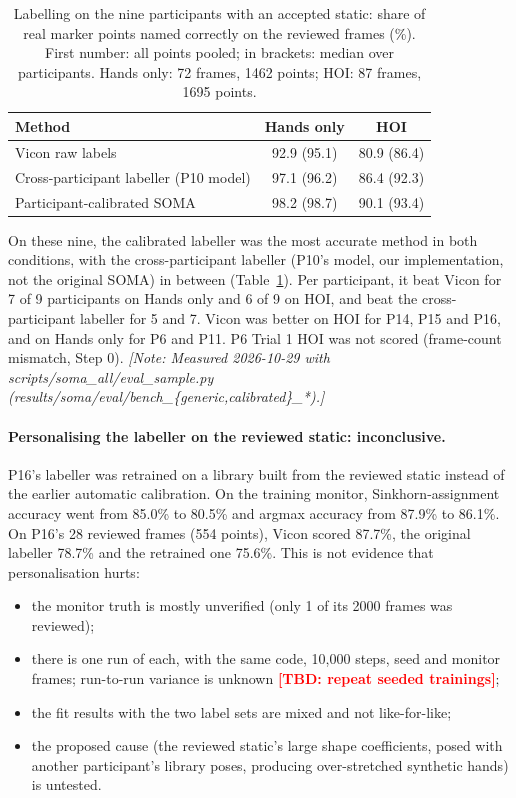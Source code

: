 \documentclass[11pt,a4paper]{article}
\newcommand{\tbd}[1]{\textcolor{red}{\textbf{[TBD: #1]}}}
\newcommand{\note}[1]{\textcolor{orange!80!black}{\textit{[Note: #1]}}}
\begin{document}
\begin{table}[h]\centering\small
\caption{Labelling on the nine participants with an accepted static: share of real marker points named correctly on the
reviewed frames (\%). First number: all points pooled; in brackets: median over participants. Hands only: 72 frames,
1462 points; HOI: 87 frames, 1695 points.}\label{tab:bench-label}
\begin{tabular}{lcc}\toprule
Method & Hands only & HOI \\\midrule
Vicon raw labels & 92.9 (95.1) & 80.9 (86.4) \\
Cross-participant labeller (P10 model) & 97.1 (96.2) & 86.4 (92.3) \\
Participant-calibrated SOMA & 98.2 (98.7) & 90.1 (93.4) \\\bottomrule
\end{tabular}
\end{table}
On these nine, the calibrated labeller was the most accurate method in both conditions, with the cross-participant labeller
(P10's model, our implementation, not the original SOMA) in between (Table~\ref{tab:bench-label}). Per participant, it beat Vicon for 7 of 9 participants on Hands only and 6 of 9 on
HOI, and beat the cross-participant labeller for 5 and 7. Vicon was better on HOI for P14, P15 and P16, and on Hands only for P6
and P11. P6 Trial 1 HOI was not scored (frame-count mismatch, Step 0).
\note{Measured 2026-10-29 with scripts/soma\_all/eval\_sample.py (results/soma/eval/bench\_\{generic,calibrated\}\_*).}

\paragraph{Personalising the labeller on the reviewed static: inconclusive.}\label{sec:res-personalisation}
P16's labeller was retrained on a library built from the reviewed static instead of the earlier automatic
calibration. On the training monitor, Sinkhorn-assignment accuracy went from 85.0\% to 80.5\% and argmax accuracy from
87.9\% to 86.1\%. On P16's 28 reviewed frames (554 points), Vicon scored 87.7\%, the original labeller 78.7\% and the
retrained one 75.6\%. This is not evidence that personalisation hurts:
\begin{itemize}[nosep]
  \item the monitor truth is mostly unverified (only 1 of its 2000 frames was reviewed);
  \item there is one run of each, with the same code, 10{,}000 steps, seed and monitor frames; run-to-run variance is
  unknown \tbd{repeat seeded trainings};
  \item the fit results with the two label sets are mixed and not like-for-like;
  \item the proposed cause (the reviewed static's large shape coefficients, posed with another participant's library
  poses, producing over-stretched synthetic hands) is untested.
\end{itemize}
\end{document}
